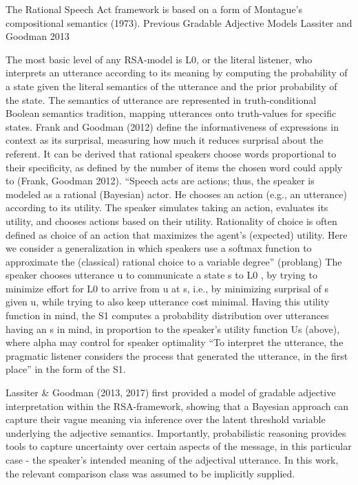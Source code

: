 The Rational Speech Act framework is based on a form of Montague’s compositional semantics (1973). 
Previous Gradable Adjective Models
Lassiter and Goodman 2013

The most basic level of any RSA-model is L0, or the literal listener, who interprets an utterance according to its meaning by computing the probability of a state given the literal semantics of the utterance and the prior probability of the state.  The semantics of utterance are represented in truth-conditional Boolean semantics tradition, mapping utterances onto truth-values for specific states. Frank and Goodman (2012) define the informativeness of expressions in context as its surprisal, measuring how much it reduces surprisal about the referent. It can be derived that rational speakers choose words proportional to their specificity, as defined by the number of items the chosen word could apply to (Frank, Goodman 2012).   
“Speech acts are actions; thus, the speaker is modeled as a rational (Bayesian) actor. He chooses an action (e.g., an utterance) according to its utility. The speaker simulates taking an action, evaluates its utility, and chooses actions based on their utility. Rationality of choice is often defined as choice of an action that maximizes the agent’s (expected) utility. Here we consider a generalization in which speakers use a softmax function to approximate the (classical) rational choice to a variable degree” (problang)
The speaker chooses utterance u to communicate a state s to L0 , by trying to minimize effort for L0 to arrive from u at s, i.e., by minimizing surprisal of s given u, while trying to also keep utterance cost minimal. Having this utility function in mind, the S1 computes a probability distribution over utterances having an s in mind, in proportion to the speaker’s utility function Us (above), where alpha may control for speaker optimality  
“To interpret the utterance, the pragmatic listener considers the process that generated the utterance, in the first place” in the form of the S1. 

Lassiter \& Goodman (2013, 2017) first provided a model of gradable adjective interpretation within the RSA-framework, showing that a Bayesian approach can capture their vague meaning via inference over the latent threshold variable underlying the adjective semantics. Importantly, probabilistic reasoning provides tools to capture uncertainty over certain aspects of the message, in this particular case - the speaker’s intended meaning of the adjectival utterance.  
In this work, the relevant comparison class was assumed to be implicitly supplied. 

